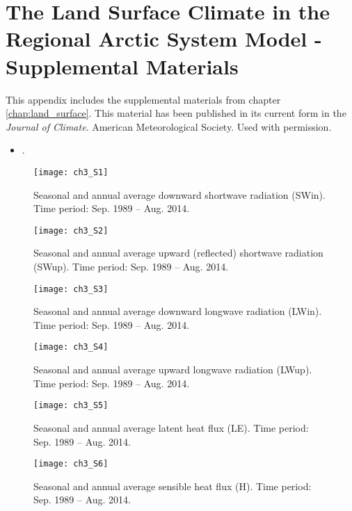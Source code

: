 \appendix
\raggedbottom\sloppy

\chapter{The Land Surface Climate in the Regional Arctic System Model - Supplemental Materials}
\label{chap:land_surface_sup}

This appendix includes the supplemental materials from chapter \ref{chap:land_surface}.
This material has been published in its current form in the \textit{Journal of Climate}.
\textcopyright American Meteorological Society.
Used with permission.
\begin{itemize}
    \item {}.
\end{itemize}

\begin{figure}
    \centering
    \texttt{[image: ch3\_S1]}
    \caption{Seasonal and annual average downward shortwave radiation (SWin).
    Time period: Sep. 1989 – Aug. 2014.}
\end{figure}

\begin{figure}
    \centering
    \texttt{[image: ch3\_S2]}
    \caption{Seasonal and annual average upward (reflected) shortwave radiation (SWup).
    Time period: Sep. 1989 – Aug. 2014.}
\end{figure}

\begin{figure}
    \centering
    \texttt{[image: ch3\_S3]}
    \caption{Seasonal and annual average downward longwave radiation (LWin).
    Time period: Sep. 1989 – Aug. 2014.}
\end{figure}

\begin{figure}
    \centering
    \texttt{[image: ch3\_S4]}
    \caption{Seasonal and annual average upward longwave radiation (LWup).
    Time period: Sep. 1989 – Aug. 2014.}
\end{figure}

\begin{figure}
    \centering
    \texttt{[image: ch3\_S5]}
    \caption{Seasonal and annual average latent heat flux (LE).
    Time period: Sep. 1989 – Aug. 2014.}
\end{figure}

\begin{figure}
    \centering
    \texttt{[image: ch3\_S6]}
    \caption{Seasonal and annual average sensible heat flux (H).
    Time period: Sep. 1989 – Aug. 2014.}
\end{figure}

